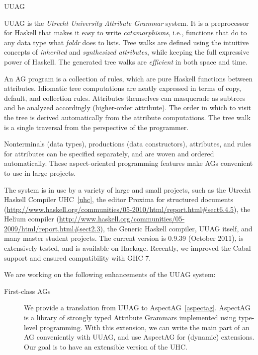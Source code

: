 \begin{hcarentry}[updated]{UUAG}
\label{uuag}
\makeheader

UUAG is the \emph{Utrecht University Attribute Grammar} system. It is a preprocessor for Haskell
that makes it easy to write \emph{catamorphisms}, i.e., functions that do to any data type what
\emph{foldr} does to lists. Tree walks are defined using the intuitive concepts of
\emph{inherited} and \emph{synthesized attributes}, while keeping the full expressive power
of Haskell. The generated tree walks are \emph{efficient} in both space and time.

An AG program is a collection of rules, which are pure Haskell functions between attributes.
Idiomatic tree computations are neatly expressed in terms of copy, default, and collection rules.
Attributes themselves can masquerade as subtrees and be analyzed accordingly (higher-order attribute). The order in which to visit the tree is derived automatically from the attribute computations. The tree walk is a single traversal from the perspective of the programmer.

Nonterminals (data types), productions (data constructors), attributes, and rules for attributes can be specified separately, and are woven and ordered automatically. These aspect-oriented programming features make AGs convenient to use in large projects.

The system is in use by a variety of large and small projects, such as the Utrecht Haskell Compiler UHC~\cref{uhc}, the editor Proxima for structured documents (\url{http://www.haskell.org/communities/05-2010/html/report.html#sect6.4.5}), the Helium compiler (\url{http://www.haskell.org/communities/05-2009/html/report.html#sect2.3}), the Generic Haskell compiler, UUAG itself, and many master student projects.
The current version is 0.9.39 (October 2011), is extensively tested, and is available on Hackage.
Recently, we improved the Cabal support and ensured compatibility with GHC 7.

We are working on the following enhancements of the UUAG system:
\begin{description}
\item[First-class AGs]
  We provide a translation from UUAG to AspectAG~\cref{aspectag}.
  AspectAG is a library of strongly typed Attribute Grammars
  implemented using type-level programming. With this extension, we can write the main part of
  an AG conveniently with UUAG, and use AspectAG for (dynamic) extensions. Our goal is to have
  an extensible version of the UHC.


\end{description}
\end{hcarentry}
